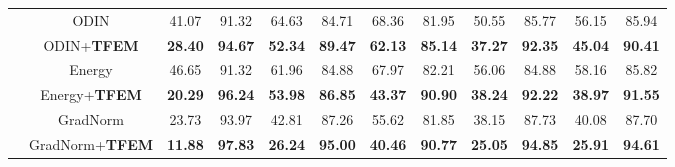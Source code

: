 \documentclass{article}
\begin{document}
\begin{table}[htbp]
{\begin{tabular}{cccccccccccc}
 & ODIN & 41.07 & 91.32 & 64.63 & 84.71 & 68.36 & 81.95 & 50.55 & 85.77 & 56.15 & 85.94 \\
 & ODIN+\textbf{TFEM} & \textbf{28.40} & \textbf{94.67} & \textbf{52.34} & \textbf{89.47} & \textbf{62.13} & \textbf{85.14} & \textbf{37.27} & \textbf{92.35} & \textbf{45.04} & \textbf{90.41} \\ \cline{2-12} 
 & Energy & 46.65 & 91.32 & 61.96 & 84.88 & 67.97 & 82.21 & 56.06 & 84.88 & 58.16 & 85.82 \\
 & Energy+\textbf{TFEM} & \textbf{20.29} & \textbf{96.24} & \textbf{53.98} & \textbf{86.85} & \textbf{43.37} & \textbf{90.90} & \textbf{38.24} & \textbf{92.22} & \textbf{38.97} & \textbf{91.55} \\ \cline{2-12} 
 & GradNorm & 23.73 & 93.97 & 42.81 & 87.26 & 55.62 & 81.85 & 38.15 & 87.73 & 40.08 & 87.70 \\
 & GradNorm+\textbf{TFEM} & \textbf{11.88} & \textbf{97.83} & \textbf{26.24} & \textbf{95.00} & \textbf{40.46} & \textbf{90.77} & \textbf{25.05} & \textbf{94.85} & \textbf{25.91} & \textbf{94.61} \\ \hline
\end{tabular}\label{othermethod}
}
\end{table}
\end{document}
